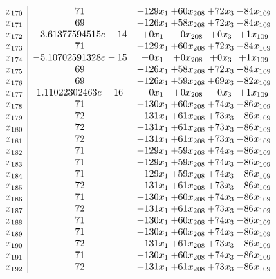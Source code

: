 \documentclass[11pt]{article}
\begin{document}
\[\begin{array}{c| c c@{\hskip 2pt} c@{\hskip 2pt} c@{\hskip 2pt} c@{\hskip 2pt} }
 x_{170}   &  71 & -129 x_{1} & + 60 x_{208} & + 72 x_{3} & -84 x_{109}\\
 x_{171}   &  69 & -126 x_{1} & + 58 x_{208} & + 72 x_{3} & -84 x_{109}\\
 x_{172}   &  -3.61377594515e-14 & + 0 x_{1} & -0 x_{208} & + 0 x_{3} & + 1 x_{109}\\
 x_{173}   &  71 & -129 x_{1} & + 60 x_{208} & + 72 x_{3} & -84 x_{109}\\
 x_{174}   &  -5.10702591328e-15 & -0 x_{1} & + 0 x_{208} & + 0 x_{3} & + 1 x_{109}\\
 x_{175}   &  69 & -126 x_{1} & + 58 x_{208} & + 72 x_{3} & -84 x_{109}\\
 x_{176}   &  69 & -126 x_{1} & + 59 x_{208} & + 69 x_{3} & -82 x_{109}\\
 x_{177}   &  1.11022302463e-16 & -0 x_{1} & + 0 x_{208} & -0 x_{3} & + 1 x_{109}\\
 x_{178}   &  71 & -130 x_{1} & + 60 x_{208} & + 74 x_{3} & -86 x_{109}\\
 x_{179}   &  72 & -131 x_{1} & + 61 x_{208} & + 73 x_{3} & -86 x_{109}\\
 x_{180}   &  72 & -131 x_{1} & + 61 x_{208} & + 73 x_{3} & -86 x_{109}\\
 x_{181}   &  72 & -131 x_{1} & + 61 x_{208} & + 73 x_{3} & -86 x_{109}\\
 x_{182}   &  71 & -129 x_{1} & + 59 x_{208} & + 74 x_{3} & -86 x_{109}\\
 x_{183}   &  71 & -129 x_{1} & + 59 x_{208} & + 74 x_{3} & -86 x_{109}\\
 x_{184}   &  71 & -129 x_{1} & + 59 x_{208} & + 74 x_{3} & -86 x_{109}\\
 x_{185}   &  72 & -131 x_{1} & + 61 x_{208} & + 73 x_{3} & -86 x_{109}\\
 x_{186}   &  71 & -130 x_{1} & + 60 x_{208} & + 74 x_{3} & -86 x_{109}\\
 x_{187}   &  72 & -131 x_{1} & + 61 x_{208} & + 73 x_{3} & -86 x_{109}\\
 x_{188}   &  71 & -130 x_{1} & + 60 x_{208} & + 74 x_{3} & -86 x_{109}\\
 x_{189}   &  71 & -130 x_{1} & + 60 x_{208} & + 74 x_{3} & -86 x_{109}\\
 x_{190}   &  72 & -131 x_{1} & + 61 x_{208} & + 73 x_{3} & -86 x_{109}\\
 x_{191}   &  71 & -130 x_{1} & + 60 x_{208} & + 74 x_{3} & -86 x_{109}\\
 x_{192}   &  72 & -131 x_{1} & + 61 x_{208} & + 73 x_{3} & -86 x_{109}\\

\end{array}\]
\end{document}
